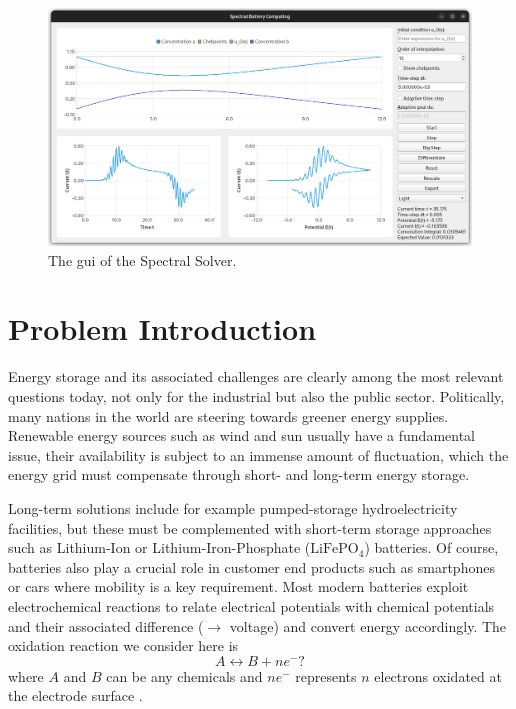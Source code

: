 \documentclass{prettytex/ox/mmsc-special-topic}
\begin{document}
  \begin{figure}[H]
    \centering
    \includegraphics[width=\linewidth]{figures/screenshot.png}
    \caption{The \gls{gui} of the Spectral Solver.}
    \label{fig:gui}
  \end{figure}

  \pagebreak
  \pagestyle{normal}

  \section{Problem Introduction}
  \label{sec:introduction}
  Energy storage and its associated challenges are clearly among the most relevant questions today, not only for the industrial but also the public sector.
  Politically, many nations in the world are steering towards greener energy supplies.
  Renewable energy sources such as wind and sun usually have a fundamental issue, their availability is subject to an immense amount of fluctuation, which the energy grid must compensate through short- and long-term energy storage.

  Long-term solutions include for example pumped-storage hydroelectricity facilities, but these must be complemented with short-term storage approaches such as Lithium-Ion or Lithium-Iron-Phosphate ($\text{LiFePO}_4$) batteries.
  Of course, batteries also play a crucial role in customer end products such as smartphones or cars where mobility is a key requirement.
  Most modern batteries exploit electrochemical reactions to relate electrical potentials with chemical potentials and their associated difference ($\rightarrow$ voltage) and convert energy accordingly.
  The oxidation reaction we consider here is
  \begin{equation}
    A \leftrightarrow B + n e^-? \label{eq:oxidation-reaction}
  \end{equation}
  where $A$ and $B$ can be any chemicals and $n e^-$ represents $n$ electrons oxidated at the electrode surface \parencite{Gavaghan2000Jan}.
\end{document}
